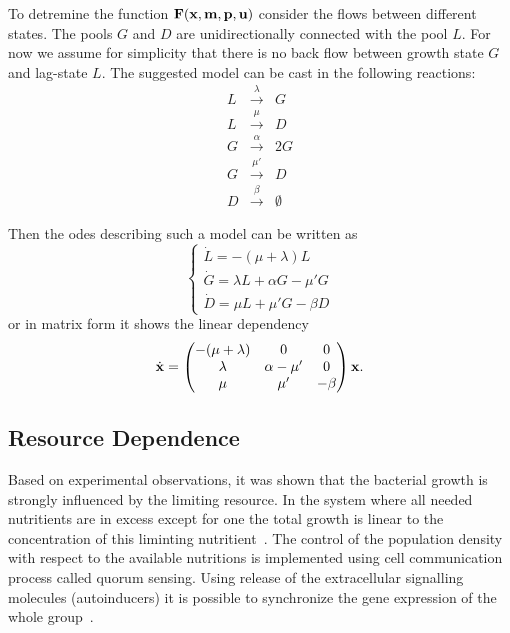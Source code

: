 \documentclass[10pt,A4paper]{article}
\begin{document}
To detremine the function $\mathbf{F}(\mathbf{x}, \mathbf{m}, \mathbf{p}, \mathbf{u})$ consider the flows between different states.
The pools $G$ and $D$ are unidirectionally connected with the pool $L$. 
For now we assume for simplicity that there is no back flow between growth state $G$ and lag-state $L$. 
The suggested model can be cast in the following reactions: 
\begin{eqnarray}
L &\stackrel{\lambda}{\longrightarrow} & G\\
L &\stackrel{\mu}{\longrightarrow} & D\\
G &\stackrel{\alpha}{\longrightarrow} & 2G\\
G &\stackrel{\mu'}{\longrightarrow} & D\\
D &\stackrel{\beta}{\longrightarrow} & \emptyset
\end{eqnarray}

Then the \acp{ode} describing such a model can be written as 
\begin{equation}
\begin{cases}
    \dot{L} = -(\mu + \lambda) L\\
    \dot{G} = \lambda L + \alpha G - \mu' G\\
    \dot{D} = \mu  L + \mu' G- \beta D  
\end{cases}
\end{equation}
or in matrix form it shows the linear dependency
\begin{equation}
    \dot {\mathbf{x}}  = \begin{pmatrix}
                    -(\mu + \lambda) & 0             & 0      \\
                    \lambda          & \alpha - \mu' & 0      \\
                    \mu              & \mu'          & -\beta 
                 \end{pmatrix} \mathbf{x} .
\end{equation}

\subsection{Resource Dependence}

Based on experimental observations, it was shown that the bacterial growth is strongly influenced by the limiting resource.
In the system where all needed nutritients are in excess except for one the total growth is linear to the concentration of this liminting nutritient~\cite{hibbing_bacterial_2010, monod_growth_1949}.
The control of the population density with respect to the available nutritions is implemented using cell communication process called quorum sensing. 
Using release of the extracellular signalling molecules (autoinducers) it is possible to synchronize the gene expression of the whole group~\cite{ng_bacterial_2009}.
\end{document}
